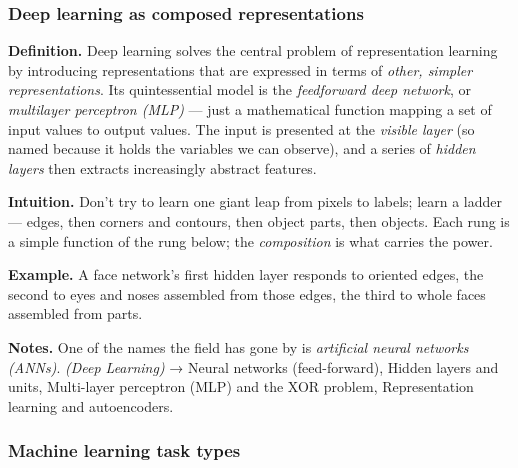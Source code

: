 \documentclass[
  10pt,
  letterpaper,
  onecolumn]{article}
\begin{document}
\hypertarget{deep-learning-as-composed-representations}{%
\subsubsection{Deep learning as composed
representations}\label{deep-learning-as-composed-representations}}

\textbf{Definition.} Deep learning solves the central problem of
representation learning by introducing representations that are
expressed in terms of \emph{other, simpler representations}. Its
quintessential model is the \emph{feedforward deep network}, or
\emph{multilayer perceptron (MLP)} --- just a mathematical function
mapping a set of input values to output values. The input is presented
at the \emph{visible layer} (so named because it holds the variables we
can observe), and a series of \emph{hidden layers} then extracts
increasingly abstract features.

\textbf{Intuition.} Don't try to learn one giant leap from pixels to
labels; learn a ladder --- edges, then corners and contours, then object
parts, then objects. Each rung is a simple function of the rung below;
the \emph{composition} is what carries the power.

\textbf{Example.} A face network's first hidden layer responds to
oriented edges, the second to eyes and noses assembled from those edges,
the third to whole faces assembled from parts.

\textbf{Notes.} One of the names the field has gone by is
\emph{artificial neural networks (ANNs)}. \emph{(Deep Learning)} →
Neural networks (feed-forward), Hidden layers and units, Multi-layer
perceptron (MLP) and the XOR problem, Representation learning and
autoencoders.

\hypertarget{machine-learning-task-types}{%
\subsubsection{Machine learning task
types}\label{machine-learning-task-types}}
\end{document}

